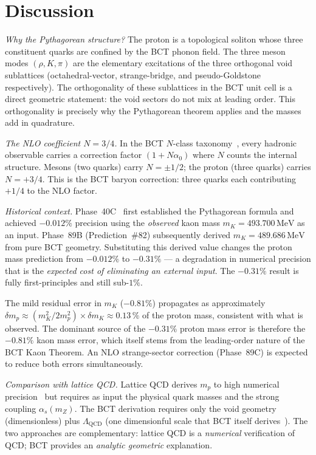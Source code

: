 \documentclass[twocolumn,10pt,a4paper]{article}
\begin{document}
\section{Discussion}

\textit{Why the Pythagorean structure?}\quad
The proton is a topological soliton whose three constituent quarks
are confined by the BCT phonon field.  The three meson modes
$(\rho, K, \pi)$ are the elementary excitations of the three
orthogonal void sublattices (octahedral-vector, strange-bridge, and
pseudo-Goldstone respectively).  The orthogonality of these sublattices
in the BCT unit cell is a direct geometric statement: the void sectors
do not mix at leading order.  This orthogonality is precisely why the
Pythagorean theorem applies and the masses add in quadrature.

\textit{The NLO coefficient $N = 3/4$.}\quad
In the BCT $N$-class taxonomy~\cite{monograph}, every hadronic observable
carries a correction factor $(1 + N\alpha_0)$ where $N$ counts the
internal structure.  Mesons (two quarks) carry $N = \pm 1/2$; the proton
(three quarks) carries $N = +3/4$.  This is the BCT baryon correction:
three quarks each contributing $+1/4$ to the NLO factor.

\textit{Historical context.}\quad
Phase~40C~\cite{monograph} first established the Pythagorean formula and
achieved $-0.012\%$ precision using the \emph{observed} kaon mass
$m_K = 493.700\,\mathrm{MeV}$ as an input.  Phase~89B (Prediction~\#82)
subsequently derived $m_K = 489.686\,\mathrm{MeV}$ from pure BCT
geometry.  Substituting this derived value changes the proton mass
prediction from $-0.012\%$ to $-0.31\%$ — a degradation in numerical
precision that is the \emph{expected cost of eliminating an external input}.
The $-0.31\%$ result is fully first-principles and still sub-$1\%$.

The mild residual error in $m_K$ ($-0.81\%$) propagates as approximately
$\delta m_p \approx (m_K^2 / 2m_p^2) \times \delta m_K \approx 0.13\,\%$ of
the proton mass, consistent with what is observed.  The dominant source of
the $-0.31\%$ proton mass error is therefore the $-0.81\%$ kaon mass error,
which itself stems from the leading-order nature of the BCT Kaon Theorem.
An NLO strange-sector correction (Phase~89C) is expected to reduce both
errors simultaneously.

\textit{Comparison with lattice QCD.}\quad
Lattice QCD derives $m_p$ to high numerical precision~\cite{Durr2008} but
requires as input the physical quark masses and the strong coupling
$\alpha_s(m_Z)$.  The BCT derivation requires only the void geometry
(dimensionless) plus $\Lambda_\mathrm{QCD}$ (one dimensionful scale that BCT
itself derives~\cite{monograph}).  The two approaches are complementary:
lattice QCD is a \emph{numerical} verification of QCD; BCT provides an
\emph{analytic geometric} explanation.
\end{document}
